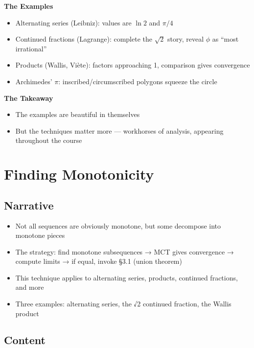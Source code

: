 \documentclass[
  10pt,
  letterpaper,
]{scrbook}
\providecommand{\tightlist}{%
  \setlength{\itemsep}{0pt}\setlength{\parskip}{0pt}}
\begin{document}
\textbf{The Examples}

\begin{itemize}
\tightlist
\item
  Alternating series (Leibniz): values are \(\ln 2\) and \(\pi/4\)
\item
  Continued fractions (Lagrange): complete the \(\sqrt{2}\) story,
  reveal \(\phi\) as ``most irrational''
\item
  Products (Wallis, Viète): factors approaching 1, comparison gives
  convergence
\item
  Archimedes' \(\pi\): inscribed/circumscribed polygons squeeze the
  circle
\end{itemize}

\textbf{The Takeaway}

\begin{itemize}
\tightlist
\item
  The examples are beautiful in themselves
\item
  But the techniques matter more --- workhorses of analysis, appearing
  throughout the course
\end{itemize}

\section{Finding Monotonicity}\label{finding-monotonicity}

\subsection{Narrative}\label{narrative-15}

\begin{itemize}
\tightlist
\item
  Not all sequences are obviously monotone, but some decompose into
  monotone pieces
\item
  The strategy: find monotone subsequences → MCT gives convergence →
  compute limits → if equal, invoke §3.1 (union theorem)
\item
  This technique applies to alternating series, products, continued
  fractions, and more
\item
  Three examples: alternating series, the √2 continued fraction, the
  Wallis product
\end{itemize}

\subsection{Content}\label{content-15}
\end{document}

